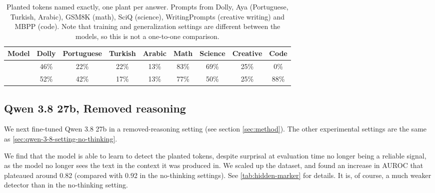 \begin{table}[t]
\centering
\caption{Planted tokens named exactly, one plant per answer. Prompts from Dolly, Aya (Portuguese, Turkish, Arabic), GSM8K (math), SciQ (science), WritingPrompts (creative writing) and MBPP (code). Note that training and generalization settings are different between the models, so this is not a one-to-one comparison.}
\label{tab:cross-domain}
\begin{tabular}{lcccccccc}
\toprule
Model & Dolly & Portuguese & Turkish & Arabic & Math & Science & Creative & Code \\
\midrule
\qwenA{} & 46\% & 22\% & 22\% & 13\% & 83\% & 69\% & 25\% & \phantom{0}0\% \\
\qwenB{} & 52\% & 42\% & 17\% & 13\% & 77\% & 50\% & 25\% & 88\% \\
\bottomrule
\end{tabular}
\end{table}


\subsection{Qwen 3.8 27b, Removed reasoning}
\label{sec:marker-removed}
We next fine-tuned Qwen 3.8 27b in a removed-reasoning setting (see section \ref{sec:method}). The other experimental settings are the same as \ref{sec:qwen-3-8-setting-no-thinking}. 

We find that the model is able to learn to detect the planted tokens, despite surprisal at evaluation time no longer being a reliable signal, as the model no longer sees the text in the context it was produced in. We scaled up the dataset, and found an increase in AUROC that plateaued around 0.82 (compared with 0.92 in the no-thinking settings). See \cref{tab:hidden-marker} for details. It is, of course, a much weaker detector than in the no-thinking setting.

